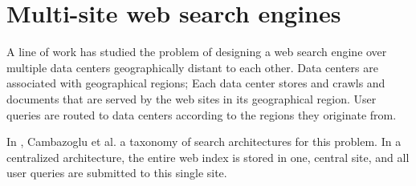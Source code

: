 



\section{Multi-site web search engines}
A line of work has studied the problem of designing a web search engine over multiple data centers geographically distant to each other.
Data centers are associated with geographical regions;
Each data center stores and crawls and documents that are served by the web sites in its geographical region.
User queries are routed to data centers according to the regions they originate from.


In \cite{yates:multisitefeasibility}, Cambazoglu et al. a taxonomy of search architectures for this problem.
In a centralized architecture, the entire web index is stored in one, central site,
and all user queries are submitted to this single site.




